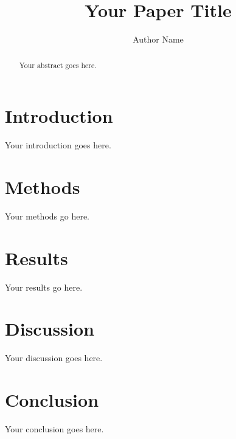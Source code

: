 \documentclass[runningheads]{llncs}
\begin{document}
\title{Your Paper Title}
\author{Author Name}

\maketitle

\begin{abstract}
Your abstract goes here.
\end{abstract}

\section{Introduction}
Your introduction goes here.

\section{Methods}
Your methods go here.

\section{Results}
Your results go here.

\section{Discussion}
Your discussion goes here.

\section{Conclusion}
Your conclusion goes here.



\end{document}
